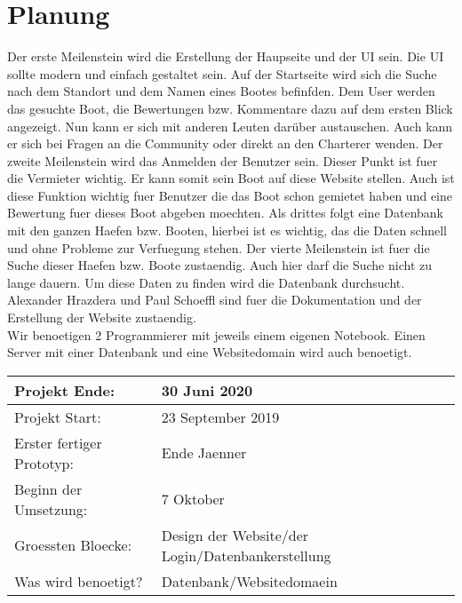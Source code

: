 \documentclass[12pt]{article}
\theoremstyle{definition}
\begin{document}
\section{Planung}
Der erste Meilenstein wird die Erstellung der Haupseite und der UI sein.
Die UI sollte modern und einfach gestaltet sein. Auf der Startseite wird sich die Suche nach dem Standort und dem Namen eines Bootes befinfden. Dem User werden das gesuchte Boot, die Bewertungen bzw. Kommentare dazu auf dem ersten Blick angezeigt. Nun kann er sich mit anderen Leuten darüber austauschen. Auch kann er sich bei Fragen an die Community oder direkt an den Charterer wenden. 
Der zweite Meilenstein wird das Anmelden der Benutzer sein. Dieser Punkt ist fuer die Vermieter wichtig. Er kann somit sein Boot auf diese Website stellen. Auch ist diese Funktion wichtig fuer Benutzer die das Boot schon gemietet haben und eine Bewertung fuer dieses Boot abgeben moechten.
Als drittes folgt eine Datenbank mit den ganzen Haefen bzw. Booten, hierbei ist es wichtig, das die Daten schnell und ohne Probleme zur Verfuegung stehen. Der vierte Meilenstein ist fuer die Suche dieser Haefen bzw. Boote zustaendig. Auch hier darf die Suche nicht zu lange dauern. Um diese Daten zu finden wird die Datenbank durchsucht.\\ Alexander Hrazdera und Paul Schoeffl sind fuer die Dokumentation und der Erstellung der Website zustaendig.\\ Wir benoetigen 2 Programmierer mit jeweils einem eigenen Notebook. Einen Server mit einer Datenbank und eine Websitedomain wird auch benoetigt.
​
\newcommand{\projektend}{30 Juni 2020}
\newcommand{\projectstart}{23 September 2019}
\newcommand{\firstresult}{Ende Jaenner}
\newcommand{\beginofprog}{7 Oktober}
\newcommand{\bigBlocks}{Design der Website/der Login/Datenbankerstellung}
\newcommand{\whatisneeded}{Datenbank/Websitedomaein}
​
\begin{flushleft} 
\begin{tabular}{|l|l|}
\hline
Projekt Ende: & \projektend \\ \hline
Projekt Start: & \projectstart \\ \hline
Erster fertiger Prototyp: & \firstresult \\ \hline
Beginn der Umsetzung: & \beginofprog \\ \hline
Groessten Bloecke: & \bigBlocks \\ \hline
Was wird benoetigt? & \whatisneeded \\ \hline
\end{tabular}
\end{flushleft}
\cite{wikipedia_2016}
{}

\end{document}
